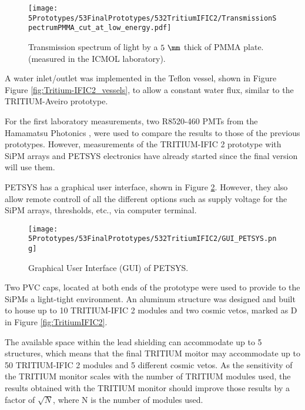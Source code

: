 \begin{figure}[h]
\centering
\texttt{[image: 5Prototypes/53FinalPrototypes/532TritiumIFIC2/TransmissionSpectrumPMMA\_cut\_at\_low\_energy.pdf]}
\caption{Transmission spectrum of light by a $5~\mm$ thick of PMMA plate. (measured in the ICMOL laboratory). \label{fig:PMMATransmissionSpectrum}}
\end{figure}	

A water inlet/outlet was implemented in the Teflon vessel, shown in Figure Figure \ref{fig:Tritium-IFIC2_vessels}, to allow a constant water flux, similar to the TRITIUM-Aveiro prototype.

For the first laboratory measurements, two R8520-460 PMTs from the Hamamatsu Photonics \cite{DataSheetPMTs}, were used to compare the results to those of the previous prototypes. However, measurements of the TRITIUM-IFIC 2 prototype with SiPM arrays and PETSYS electronics have already started since the final version will use them.


PETSYS has a graphical user interface, shown in Figure \ref{fig:GUI_PETSYS}. However, they also allow remote controll of all the different options such as supply voltage for the SiPM arrays, thresholds, etc., via computer terminal. 

\begin{figure}[h]
\centering
\texttt{[image: 5Prototypes/53FinalPrototypes/532TritiumIFIC2/GUI\_PETSYS.png]}
\caption{Graphical User Interface (GUI) of PETSYS.\label{fig:GUI_PETSYS}}
\end{figure}

Two PVC caps, located at both ends of the prototype were used to provide to the SiPMs a light-tight environment. An aluminum structure was designed and built to house up to 10 TRITIUM-IFIC 2 modules and two cosmic vetos, marked as D in Figure \ref{fig:TritiumIFIC2}.

The available space within the lead shielding can accommodate up to 5 structures, which means that the final TRITIUM moitor may accommodate up to 50 TRITIUM-IFIC 2 modules and 5 different cosmic vetos. As the sensitivity of the TRITIUM monitor scales with the number of TRITIUM modules used, the results obtained with the TRITIUM monitor should improve those results by a factor of $\sqrt{N}$, where N is the number of modules used.

